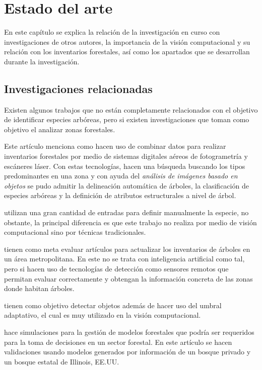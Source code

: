 \chapter{Estado del arte}
En este capítulo se explica la relación de la investigación en curso con investigaciones de otros autores, la importancia de la visión computacional y su relación con los inventarios forestales, así como los apartados que se desarrollan durante la investigación.

\section{Investigaciones relacionadas}
Existen algunos trabajos que no están completamente relacionados con el objetivo de identificar especies arbóreas, pero si existen investigaciones que toman como objetivo el analizar zonas forestales.

Este artículo menciona como hacen uso de combinar datos para realizar inventarios forestales por medio de sistemas digitales aéreos de fotogrametría y escáneres láser. Con estas tecnologías, hacen una búsqueda buscando los tipos predominantes en una zona y con ayuda del \emph{análisis de imágenes basado en objetos} se pudo admitir la delineación automática de árboles, la clasificación de especies arbóreas y la definición de atributos estructurales a nivel de árbol. 
\newline
\break


\citet{rf1} utilizan una gran cantidad de entradas para definir manualmente la especie, no obstante, la principal diferencia es que este trabajo no realiza por medio de visión computacional sino por técnicas tradicionales.
 
\citet{rf2} tienen como meta evaluar artículos para actualizar los inventarios de árboles en un área metropolitana. En este no se trata con inteligencia artificial como tal, pero si hacen uso de tecnologías de detección como sensores remotos que permitan evaluar correctamente y obtengan la información concreta de las zonas donde habitan  árboles.

\citet{rf3} tienen como objetivo detectar objetos además de hacer uso del umbral adaptativo, el cual es muy utilizado en la visión computacional. %

\citet{rf9} hace simulaciones para la gestión de modelos forestales que podría ser requeridos para la toma de decisiones en un sector forestal. En este artículo se hacen validaciones usando modelos generados por información de un bosque privado y un bosque estatal de Illinois, EE.UU.

